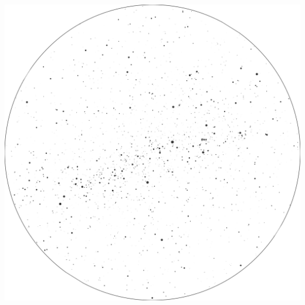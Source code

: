 \documentclass{./SAS-class-skygen}
\begin{document}
	\vspace{0.5cm}
    \begin{center}
    \includegraphics[width=\textwidth]{./pics/skychart15.png}
    \end{center}
    
    
\end{document}
